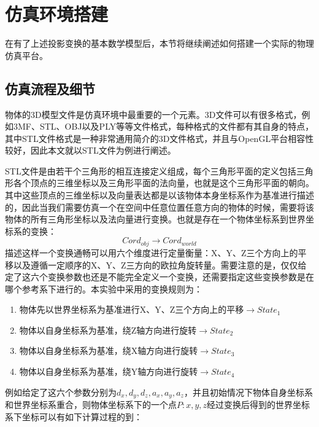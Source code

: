 \section{仿真环境搭建}
在有了上述投影变换的基本数学模型后，本节将继续阐述如何搭建一个实际的物理仿真平台。
\subsection{仿真流程及细节} %
物体的3D模型文件是仿真环境中最重要的一个元素。3D文件可以有很多格式，例如3MF、STL、OBJ以及PLY等等文件格式，每种格式的文件都有其自身的特点，其中STL文件格式是一种非常通用简介的3D文件格式，并且与OpenGL平台相容性较好，因此本文就以STL文件为例进行阐述。

STL文件是由若干个三角形的相互连接定义组成，每个三角形平面的定义包括三角形各个顶点的三维坐标以及三角形平面的法向量，也就是这个三角形平面的朝向。其中这些顶点的三维坐标以及向量表达都是以该物体本身坐标系作为基准进行描述的，因此当我们需要仿真一个在空间中任意位置任意方向的物体的时候，需要将该物体的所有三角形坐标以及法向量进行变换。也就是存在一个物体坐标系到世界坐标系的变换：
\begin{equation}
	Cord_{obj}\to Cord_{world}
\end{equation}
描述这样一个变换通畅可以用六个维度进行定量衡量：X、Y、Z三个方向上的平移以及遵循一定顺序的X、Y、Z三方向的欧拉角旋转量。需要注意的是，仅仅给定了这六个变换参数也还是不能完全定义一个变换，还需要指定这些变换参数是在哪个参考系下进行的。本实验中采用的变换规则为：
\begin{enumerate}
\item 物体先以世界坐标系为基准进行X、Y、Z三个方向上的平移$\to State_1$
\item 物体以自身坐标系为基准，绕Z轴方向进行旋转$\to State_2$
\item 物体以自身坐标系为基准，绕X轴方向进行旋转$\to State_3$
\item 物体以自身坐标系为基准，绕Y轴方向进行旋转$\to State_4$
\end{enumerate}
例如给定了这六个参数分别为${d_x,d_y,d_z,a_x,a_y,a_z}$，并且初始情况下物体自身坐标系和世界坐标系重合，则物体坐标系下的一个点$P:{x,y,z}$经过变换后得到的世界坐标系下坐标可以有如下计算过程的到：


